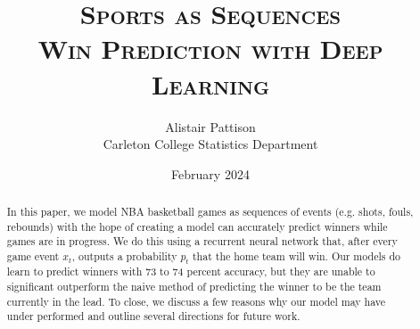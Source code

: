 \documentclass{article}
\title{\scshape
	Sports as Sequences \\[1em]
	\large Win Prediction with Deep Learning
}
\author{Alistair Pattison \\ {\small Carleton College Statistics Department}}
\date{February 2024}
\begin{document}
\maketitle

\vspace{1in}

\tableofcontents
\thispagestyle{empty}

\newpage

\pagestyle{fancy}
\setcounter{page}{1}

\begin{abstract}
	In this paper, we model NBA basketball games as sequences of events (e.g. shots, fouls, rebounds) with the hope of creating a model can accurately predict winners while games are in progress. We do this using a recurrent neural network that, after every game event $x_t$, outputs a probability $p_t$ that the home team will win. Our models do learn to predict winners with 73 to 74 percent accuracy, but they are unable to significant outperform the naive method of predicting the winner to be the team currently in the lead. To close, we discuss a few reasons why our model may have under performed and outline several directions for future work.
\end{abstract}








\clearpage

\nocite{ISL, ESL}

\printbibliography
\end{document}

